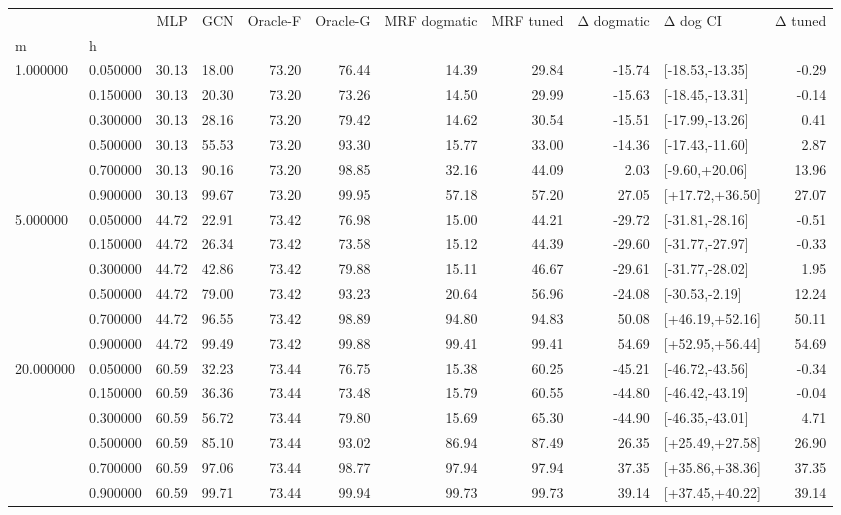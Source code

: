 \begin{tabular}{llrrrrrrrlr}
\toprule
 &  & MLP & GCN & Oracle-F & Oracle-G & MRF dogmatic & MRF tuned & Δ dogmatic & Δ dog CI & Δ tuned \\
m & h &  &  &  &  &  &  &  &  &  \\
\midrule
\multirow[t]{6}{*}{1.000000} & 0.050000 & 30.13 & 18.00 & 73.20 & 76.44 & 14.39 & 29.84 & -15.74 & [-18.53,-13.35] & -0.29 \\
 & 0.150000 & 30.13 & 20.30 & 73.20 & 73.26 & 14.50 & 29.99 & -15.63 & [-18.45,-13.31] & -0.14 \\
 & 0.300000 & 30.13 & 28.16 & 73.20 & 79.42 & 14.62 & 30.54 & -15.51 & [-17.99,-13.26] & 0.41 \\
 & 0.500000 & 30.13 & 55.53 & 73.20 & 93.30 & 15.77 & 33.00 & -14.36 & [-17.43,-11.60] & 2.87 \\
 & 0.700000 & 30.13 & 90.16 & 73.20 & 98.85 & 32.16 & 44.09 & 2.03 & [-9.60,+20.06] & 13.96 \\
 & 0.900000 & 30.13 & 99.67 & 73.20 & 99.95 & 57.18 & 57.20 & 27.05 & [+17.72,+36.50] & 27.07 \\
\cline{1-11}
\multirow[t]{6}{*}{5.000000} & 0.050000 & 44.72 & 22.91 & 73.42 & 76.98 & 15.00 & 44.21 & -29.72 & [-31.81,-28.16] & -0.51 \\
 & 0.150000 & 44.72 & 26.34 & 73.42 & 73.58 & 15.12 & 44.39 & -29.60 & [-31.77,-27.97] & -0.33 \\
 & 0.300000 & 44.72 & 42.86 & 73.42 & 79.88 & 15.11 & 46.67 & -29.61 & [-31.77,-28.02] & 1.95 \\
 & 0.500000 & 44.72 & 79.00 & 73.42 & 93.23 & 20.64 & 56.96 & -24.08 & [-30.53,-2.19] & 12.24 \\
 & 0.700000 & 44.72 & 96.55 & 73.42 & 98.89 & 94.80 & 94.83 & 50.08 & [+46.19,+52.16] & 50.11 \\
 & 0.900000 & 44.72 & 99.49 & 73.42 & 99.88 & 99.41 & 99.41 & 54.69 & [+52.95,+56.44] & 54.69 \\
\cline{1-11}
\multirow[t]{6}{*}{20.000000} & 0.050000 & 60.59 & 32.23 & 73.44 & 76.75 & 15.38 & 60.25 & -45.21 & [-46.72,-43.56] & -0.34 \\
 & 0.150000 & 60.59 & 36.36 & 73.44 & 73.48 & 15.79 & 60.55 & -44.80 & [-46.42,-43.19] & -0.04 \\
 & 0.300000 & 60.59 & 56.72 & 73.44 & 79.80 & 15.69 & 65.30 & -44.90 & [-46.35,-43.01] & 4.71 \\
 & 0.500000 & 60.59 & 85.10 & 73.44 & 93.02 & 86.94 & 87.49 & 26.35 & [+25.49,+27.58] & 26.90 \\
 & 0.700000 & 60.59 & 97.06 & 73.44 & 98.77 & 97.94 & 97.94 & 37.35 & [+35.86,+38.36] & 37.35 \\
 & 0.900000 & 60.59 & 99.71 & 73.44 & 99.94 & 99.73 & 99.73 & 39.14 & [+37.45,+40.22] & 39.14 \\
\cline{1-11}
\bottomrule
\end{tabular}
